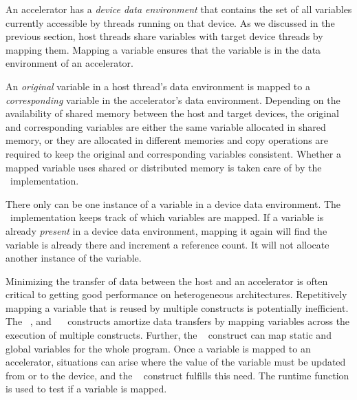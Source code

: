 An accelerator has a \emph{device data environment} that contains the set of
all variables currently accessible by threads running on that device.  As we
discussed in the previous section, host threads share variables with target
device threads by mapping them.  Mapping a variable ensures that the variable
is in the data environment of an accelerator.

An \emph{original} variable in a host thread's data environment is mapped to a
\emph{corresponding} variable in the accelerator's data environment.
Depending on the availability of shared memory between the host and target
devices, the original and corresponding variables are either the same variable
allocated in shared memory, or they are allocated in different memories and
copy operations are required to keep the original and corresponding variables
consistent. Whether a mapped variable uses shared or distributed memory is 
taken care of by the \OMP\ implementation.

There only can be one instance of a variable in a device data environment.  The
\OMP\ implementation keeps track of which variables are mapped.  If a variable
is already \emph{present} in a device data environment, mapping it again will
find the variable is already there and increment a reference count.  It
will not allocate another instance of the variable.

Minimizing the transfer of data between the host and an accelerator is often
critical to getting good performance on heterogeneous architectures.
Repetitively mapping a variable that is reused by multiple 
constructs is potentially inefficient.  The ~,
 and ~~ constructs amortize data
transfers by mapping variables across the execution of multiple 
constructs.  Further, the ~ construct can map static and
global variables for the whole program.  Once a variable is mapped to an
accelerator, situations can arise where the value of the variable must be
updated from or to the device, and the ~
construct fulfills this need.  The  runtime
function is used to test if a variable is mapped.  

